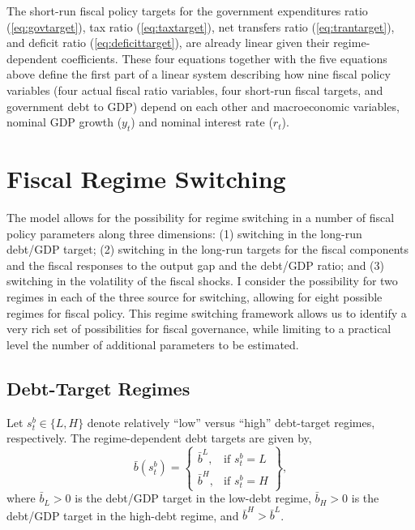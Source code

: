 \documentclass[11pt]{article}
\newcommand{\beq}{\begin{equation}}
\newcommand{\eeq}{\end{equation}}
\begin{document}
The short-run fiscal policy targets for the government expenditures ratio (\ref{eq:govtarget}), tax ratio (\ref{eq:taxtarget}), net transfers ratio (\ref{eq:trantarget}), and deficit ratio (\ref{eq:deficittarget}), are already linear given their regime-dependent coefficients.  These four equations together with the five equations above define the first part of a linear system describing how nine fiscal policy variables (four actual fiscal ratio variables, four short-run fiscal targets, and government debt to GDP) depend on each other and macroeconomic variables, nominal GDP growth ($y_t$) and nominal interest rate ($r_t$).

\section{Fiscal Regime Switching}

The model allows for the possibility for regime switching in a number of fiscal policy parameters along three dimensions: (1) switching in the long-run debt/GDP target; (2) switching in the long-run targets for the fiscal components and the fiscal responses to the output gap and the debt/GDP ratio; and (3) switching in the volatility of the fiscal shocks.  I consider the possibility for two regimes in each of the three source for switching, allowing for eight possible regimes for fiscal policy.  This regime switching framework allows us to identify a very rich set of possibilities for fiscal governance, while limiting to a practical level the number of additional parameters to be estimated.

\subsection{Debt-Target Regimes}

Let $s_t^b \in \{L,H\}$ denote relatively ``low'' versus ``high'' debt-target regimes, respectively.  The regime-dependent debt targets are given by,
\beq \bar{b}(s_t^b) = \left\{ \begin{array}{ll} \bar{b}^L, & \mbox{if }s_t^b = L \\ \bar{b}^H, & \mbox{if }s_t^b = H \end{array} \right\}, \eeq
where $\bar{b}_L > 0$ is the debt/GDP target in the low-debt regime, $\bar{b}_H > 0$ is the debt/GDP target in the high-debt regime, and $\bar{b}^H > \bar{b}^L$.
\end{document}
